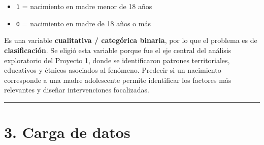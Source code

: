 \documentclass[
]{article}
\newenvironment{Shaded}{\begin{snugshade}}{\end{snugshade}}
\newcommand{\AttributeTok}[1]{\textcolor[rgb]{0.13,0.29,0.53}{#1}}
\newcommand{\ConstantTok}[1]{\textcolor[rgb]{0.56,0.35,0.01}{#1}}
\newcommand{\ControlFlowTok}[1]{\textcolor[rgb]{0.13,0.29,0.53}{\textbf{#1}}}
\newcommand{\DecValTok}[1]{\textcolor[rgb]{0.00,0.00,0.81}{#1}}
\newcommand{\FunctionTok}[1]{\textcolor[rgb]{0.13,0.29,0.53}{\textbf{#1}}}
\newcommand{\NormalTok}[1]{#1}
\newcommand{\OtherTok}[1]{\textcolor[rgb]{0.56,0.35,0.01}{#1}}
\newcommand{\SpecialCharTok}[1]{\textcolor[rgb]{0.81,0.36,0.00}{\textbf{#1}}}
\newcommand{\StringTok}[1]{\textcolor[rgb]{0.31,0.60,0.02}{#1}}
\providecommand{\tightlist}{%
  \setlength{\itemsep}{0pt}\setlength{\parskip}{0pt}}
\begin{document}
\begin{itemize}
\tightlist
\item
  \texttt{1} = nacimiento en madre menor de 18 años
\item
  \texttt{0} = nacimiento en madre de 18 años o más
\end{itemize}

Es una variable \textbf{cualitativa / categórica binaria}, por lo que el
problema es de \textbf{clasificación}. Se eligió esta variable porque
fue el eje central del análisis exploratorio del Proyecto 1, donde se
identificaron patrones territoriales, educativos y étnicos asociados al
fenómeno. Predecir si un nacimiento corresponde a una madre adolescente
permite identificar los factores más relevantes y diseñar intervenciones
focalizadas.

\begin{center}\rule{0.5\linewidth}{0.5pt}\end{center}

\section{3. Carga de datos}\label{carga-de-datos}

\begin{Shaded}
\end{Shaded}
\end{document}

